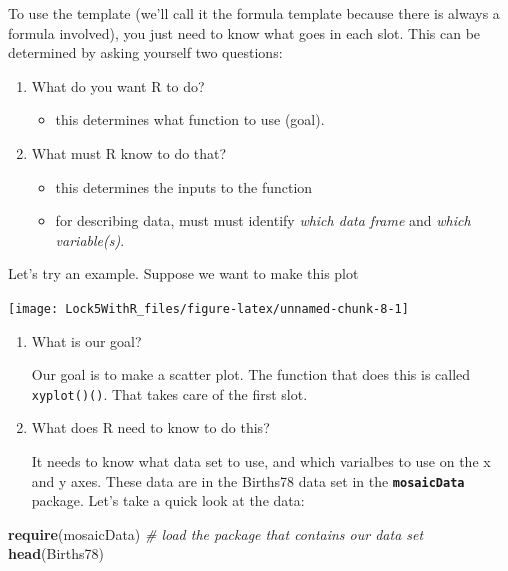 \documentclass[]{book}
\newenvironment{Shaded}{\begin{snugshade}}{\end{snugshade}}
\newcommand{\CommentTok}[1]{\textcolor[rgb]{0.56,0.35,0.01}{\textit{#1}}}
\newcommand{\KeywordTok}[1]{\textcolor[rgb]{0.13,0.29,0.53}{\textbf{#1}}}
\newcommand{\NormalTok}[1]{#1}
\providecommand{\tightlist}{%
  \setlength{\itemsep}{0pt}\setlength{\parskip}{0pt}}
\begin{document}
To use the template (we'll call it the formula template because there is always
a formula involved), you just need to know what goes in each slot. This can be determined by asking yourself two questions:

\begin{enumerate}
\def\labelenumi{\arabic{enumi}.}
\tightlist
\item
  What do you want R to do?

  \begin{itemize}
  \tightlist
  \item
    this determines what function to use (goal).
  \end{itemize}
\item
  What must R know to do that?

  \begin{itemize}
  \tightlist
  \item
    this determines the inputs to the function
  \item
    for describing data, must must identify \emph{which data frame} and \emph{which variable(s)}.
  \end{itemize}
\end{enumerate}

Let's try an example. Suppose we want to make this plot

\texttt{[image: Lock5WithR\_files/figure-latex/unnamed-chunk-8-1]}

\begin{enumerate}
\def\labelenumi{\arabic{enumi}.}
\item
  What is our goal?

  Our goal is to make a scatter plot. The function that does this is called \texttt{xyplot()()}. That takes care of the first slot.
\item
  What does R need to know to do this?

  It needs to know what data set to use, and which varialbes to use on the x and y axes. These data are in the {Births78} data set in the \textbf{\texttt{mosaicData}} package. Let's take a quick look at the data:
\end{enumerate}

\begin{Shaded}
\begin{Highlighting}[]
\KeywordTok{require}\NormalTok{(mosaicData)  }\CommentTok{# load the package that contains our data set}
\KeywordTok{head}\NormalTok{(Births78)}
\end{Highlighting}
\end{Shaded}
\end{document}
